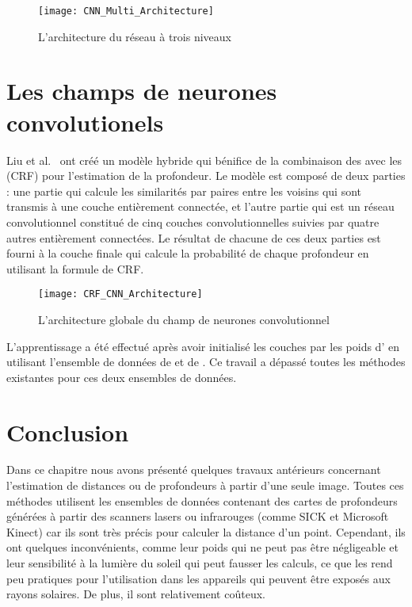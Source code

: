 \vspace{1em}

\begin{figure}[H]
\begin{center}
\texttt{[image: CNN\_Multi\_Architecture]}
\caption{L'architecture du réseau à trois niveaux}{\cite{eigen2015predicting}}
\end{center}
\end{figure}

\section{Les champs de neurones convolutionels}

Liu et al.~\cite{liu2015deep} ont créé un modèle hybride qui bénifice de la combinaison
des  avec les  (CRF) pour l'estimation de la profondeur. Le modèle est composé de deux
parties : une partie qui calcule les similarités par paires entre les
 voisins qui sont transmis à une couche entièrement connectée,
et l'autre partie qui est un réseau convolutionnel constitué de cinq couches
convolutionnelles suivies par quatre autres entièrement connectées. Le résultat
de chacune de ces deux parties est fourni à la couche finale qui calcule la
probabilité de chaque profondeur en utilisant la formule de CRF.

\begin{figure}[H]
\texttt{[image: CRF\_CNN\_Architecture]}
\caption{L'architecture globale du champ de neurones convolutionnel}{\cite{liu2015deep}}
\end{figure}

L'apprentissage a été effectué après avoir initialisé les couches par les poids
d' en utilisant l'ensemble de données de  et de
. Ce travail a dépassé toutes les méthodes existantes pour
ces deux ensembles de données.

\section{Conclusion}

Dans ce chapitre nous avons présenté quelques travaux antérieurs concernant
l'estimation de distances ou de profondeurs à partir d'une seule image.
Toutes ces méthodes utilisent les ensembles de données contenant des cartes de
profondeurs générées à partir des scanners lasers ou infrarouges (comme SICK et Microsoft Kinect)
car ils sont très précis pour calculer la distance d'un point.
Cependant, ils ont quelques inconvénients, comme leur poids qui ne peut pas être négligeable
et leur sensibilité à la lumière du soleil qui peut fausser les calculs, ce que
les rend peu pratiques pour l'utilisation dans les appareils qui peuvent être
exposés aux rayons solaires. De plus, il sont relativement coûteux.

